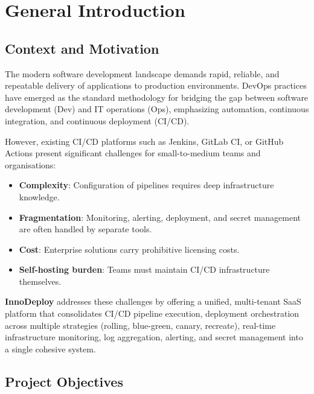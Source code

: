 \documentclass[12pt,a4paper,twoside]{report}
\begin{document}
\chapter{General Introduction}

\section{Context and Motivation}

The modern software development landscape demands rapid, reliable, and repeatable delivery of applications to production environments. DevOps practices have emerged as the standard methodology for bridging the gap between software development (Dev) and IT operations (Ops), emphasizing automation, continuous integration, and continuous deployment (CI/CD).

However, existing CI/CD platforms such as Jenkins, GitLab CI, or GitHub Actions present significant challenges for small-to-medium teams and organisations:

\begin{itemize}[noitemsep]
  \item \textbf{Complexity}: Configuration of pipelines requires deep infrastructure knowledge.
  \item \textbf{Fragmentation}: Monitoring, alerting, deployment, and secret management are often handled by separate tools.
  \item \textbf{Cost}: Enterprise solutions carry prohibitive licensing costs.
  \item \textbf{Self-hosting burden}: Teams must maintain CI/CD infrastructure themselves.
\end{itemize}

\textbf{InnoDeploy} addresses these challenges by offering a unified, multi-tenant SaaS platform that consolidates CI/CD pipeline execution, deployment orchestration across multiple strategies (rolling, blue-green, canary, recreate), real-time infrastructure monitoring, log aggregation, alerting, and secret management into a single cohesive system.

\section{Project Objectives}
\end{document}
